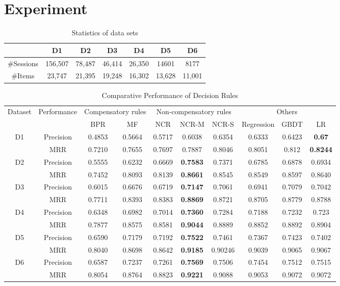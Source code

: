 \documentclass[sigconf]{acmart}
\begin{document}
\section{Experiment}\label{sec:experiment}
\begin{table}[htp]
\caption{Statistics of data sets}
\begin{center}
\begin{tabular}{|c|c|c|c|c|c|c|}
\hline
 &D1 &D2 &D3 & D4 & D5 & D6 \\\hline
\#Sessions & 156,507& 78,487 & 46,414&26,350 &14601 &8177\\\hline
\#Items & 23,747& 21,395 &19,248 & 16,302& 13,628&11,001\\\hline
\end{tabular}
\end{center}
\label{tab:data}
\end{table}%

\begin{table*}[htbp]
\caption{Comparative Performance of Decision Rules }
\label{tab:decision}
\begin{tabular}{|c|c|c|c|c|c|c|c|c|c|}
\hline
\multirow{2}{*}{Dataset} & \multirow{2}{*}{Performance}
& \multicolumn{2}{|c|}{Compensatory rules} & \multicolumn{3}{|c|}{Non-compensatory rules} & \multicolumn{3}{|c|}{Others} \\
\cline{3-10} & & BPR & MF & NCR & NCR-M & NCR-S & Regression & GBDT & LR \\\hline
\multirow{2}{*}{D1} &Precision	&0.4853	 & 0.5664&	0.5717 & 0.6038 & 0.6354 &	0.6333 & 0.6423 &\bf{0.67}\\
\cline{2-10}	    &MRR		& 0.7210&0.7655 &0.7697 & 0.7887 & 0.8046 &0.8051 & 0.812	 &\bf{0.8244}\\\hline
\multirow{2}{*}{D2} &Precision  &0.5555 &0.6232 &0.6669 & \bf{0.7583} & 0.7371 &	0.6785 & 0.6878	& 0.6934\\
\cline{2-10}		 &MRR		& 0.7452& 0.8093&	0.8139 &\bf{0.8661} & 0.8545 & 0.8549 & 0.8597	& 0.8640\\\hline
\multirow{2}{*}{D3} &Precision & 0.6015&0.6676 & 0.6719 & \bf{0.7147} & 0.7061 &	0.6941 & 0.7079 & 0.7042\\
\cline{2-10} 		&MRR		& 0.7711&0.8393 & 0.8383 &\bf{0.8869} & 0.8721 & 0.8705 &0.8779 & 0.8788\\\hline
\multirow{2}{*}{D4} &Precision & 0.6348&0.6982 & 0.7014 & \bf{0.7360} & 0.7284 & 0.7188 & 0.7232 & 0.723\\
\cline{2-10} 		&MRR		& 0.7877& 0.8575& 0.8581& \bf{0.9044} & 0.8889 &	0.8852 & 0.8892& 0.8904\\\hline
\multirow{2}{*}{D5} &Precision	& 0.6590&0.7179&	0.7192 &\bf{0.7522} &0.7461 & 0.7367 & 0.7423 &0.7402\\
\cline{2-10}		 &MRR		& 0.8040&0.8698& 0.8642 &\bf{0.9185} & 0.90246 & 0.9039 &	0.9065 & 0.9067\\\hline
\multirow{2}{*}{D6} &Precision	& 0.6587&0.7237& 0.7261 &\bf{0.7569} & 0.7506 & 0.7454 & 0.7512 & 0.7515\\
\cline{2-10}   		&MRR		&0.8054 &0.8764&	0.8823& \bf{0.9221} &	0.9088 & 0.9053 & 0.9072 & 0.9072\\\hline
\end{tabular}
\end{table*}
\end{document}
